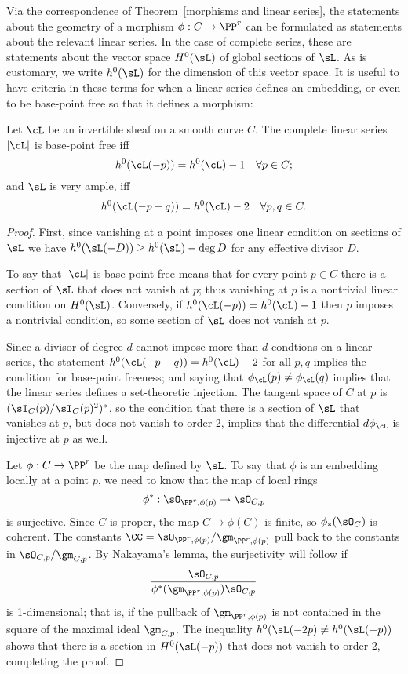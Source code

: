 Via the correspondence of Theorem~\ref{morphisms and linear series}, the statements about the geometry of a morphism $\phi : C \to \PP^r$ can be formulated as statements about the relevant linear series. In the case of complete series, these are statements about the vector space $H^{0}(\sL)$ of global sections of $\sL$. As is customary, we write $h^{0}(\sL)$ for the dimension of this vector space. It is useful to have criteria
in these terms for when a linear series defines an embedding, or even to be base-point free so that it
defines a morphism:

\begin{proposition}\label{very ample}\cite[Thm. IV.3.1]{H}
Let $\cL$ be an invertible sheaf on a smooth curve $C$. The complete linear series $|\cL|$ is base-point free iff
$$
h^0(\cL(-p)) = h^0(\cL) - 1 \quad \forall p \in C;
$$
and $\sL$ is very ample, iff
$$
h^0(\cL(-p-q)) = h^0(\cL) - 2 \quad \forall p, q \in C.
$$
\end{proposition} 

\begin{proof}
First, since vanishing at a point imposes one linear condition on sections of $\sL$ we have $h^0(\sL(-D)) \geq h^0(\sL)-\deg D$ for any
effective divisor $D$.

To say that $|\cL|$ is base-point free means that for every point $p\in C$ there is a section of $\sL$ that does not vanish at $p$; thus vanishing
at $p$ is a nontrivial linear condition on $H^0(\sL)$. Conversely, if $h^0(\cL(-p)) = h^0(\cL) - 1$ then $p$ imposes a nontrivial condition, so
some section of $\sL$ does not vanish at $p$.

Since a divisor of degree $d$ cannot impose more than $d$ condtions on a linear series, the statement $h^0(\cL(-p-q)) = h^0(\cL) - 2$ for all $p, q$ implies the condition for base-point freeness; and saying that $\phi_\cL(p) \neq \phi_\cL(q)$ implies that the linear series defines a set-theoretic injection. The tangent space of $C$ at $p$ is $(\sI_C(p)/\sI_C(p)^2)^*$, so the condition that there is a section of $\sL$ that vanishes at $p$, but does not vanish
to order 2, implies that the differential $d\phi_\cL$ is injective at $p$ as well.

Let $\phi:C \to \PP^r$ be the map defined by $\sL$. To say that $\phi$  is an embedding locally at a point $p$, we need to know that the map of local rings
$$
\phi^*: \sO_{\PP^r,\phi(p)} \to \sO_{C,p} 
$$
is surjective. Since $C$ is proper, the map $C\to \phi(C)$ is finite,
so $\phi_*(\sO_{C})$ is coherent.
 The constants  $\CC =\sO_{\PP^r,\phi(p)}/\gm_{\PP^r,\phi(p)}$ pull back to the constants in
$\sO_{C,p}/\gm_{C,p}$. 
By Nakayama's lemma, the surjectivity will follow if 
$$
\frac{\sO_{C,p}}
{\phi^*(\gm_{\PP^r,\phi(p)})  \sO_{C,p}}
$$
is 1-dimensional; that is, if  the pullback of $\gm_{\PP^r,\phi(p)}$ is not contained in the square of the
maximal ideal $\gm_{C,p}$. The inequality $h^0(\sL(-2p) \neq h^0(\sL(-p))$ shows that there is a 
section in $H^0(\sL(-p))$ that does not vanish to order 2, completing the proof.
\end{proof}


